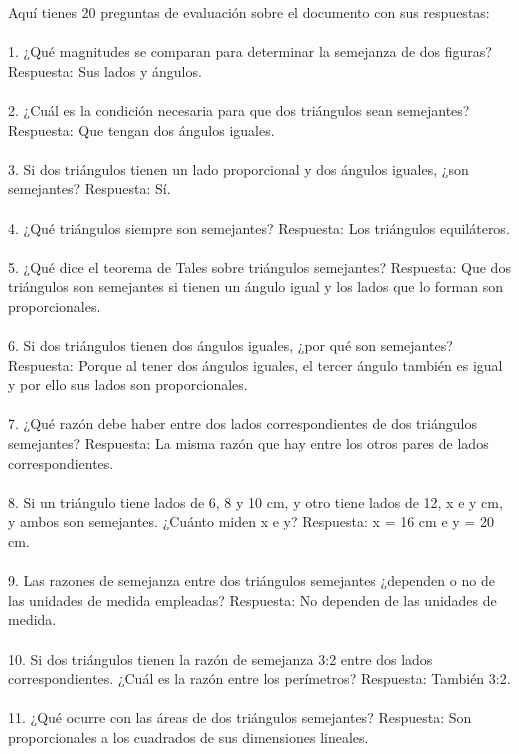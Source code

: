 \documentclass{article}
\begin{document}
Aquí tienes 20 preguntas de evaluación sobre el documento con sus respuestas:\\
\\
1. ¿Qué magnitudes se comparan para determinar la semejanza de dos figuras? Respuesta: Sus lados y ángulos.\\
\\
2. ¿Cuál es la condición necesaria para que dos triángulos sean semejantes? Respuesta: Que tengan dos ángulos iguales. \\
\\
3. Si dos triángulos tienen un lado proporcional y dos ángulos iguales, ¿son semejantes? Respuesta: Sí.\\
\\
4. ¿Qué triángulos siempre son semejantes? Respuesta: Los triángulos equiláteros. \\
\\
5. ¿Qué dice el teorema de Tales sobre triángulos semejantes? Respuesta: Que dos triángulos son semejantes si tienen un ángulo igual y los lados que lo forman son proporcionales.\\
\\
6. Si dos triángulos tienen dos ángulos iguales, ¿por qué son semejantes? Respuesta: Porque al tener dos ángulos iguales, el tercer ángulo también es igual y por ello sus lados son proporcionales. \\
\\
7. ¿Qué razón debe haber entre dos lados correspondientes de dos triángulos semejantes? Respuesta: La misma razón que hay entre los otros pares de lados correspondientes.\\
\\
8. Si un triángulo tiene lados de 6, 8 y 10 cm, y otro tiene lados de 12, x e y cm, y ambos son semejantes. ¿Cuánto miden x e y? Respuesta: x = 16 cm e y = 20 cm.\\
\\
9. Las razones de semejanza entre dos triángulos semejantes ¿dependen o no de las unidades de medida empleadas? Respuesta: No dependen de las unidades de medida.\\
\\
10. Si dos triángulos tienen la razón de semejanza 3:2 entre dos lados correspondientes. ¿Cuál es la razón entre los perímetros? Respuesta: También 3:2.\\
\\
11. ¿Qué ocurre con las áreas de dos triángulos semejantes? Respuesta: Son proporcionales a los cuadrados de sus dimensiones lineales. \\
\end{document}

